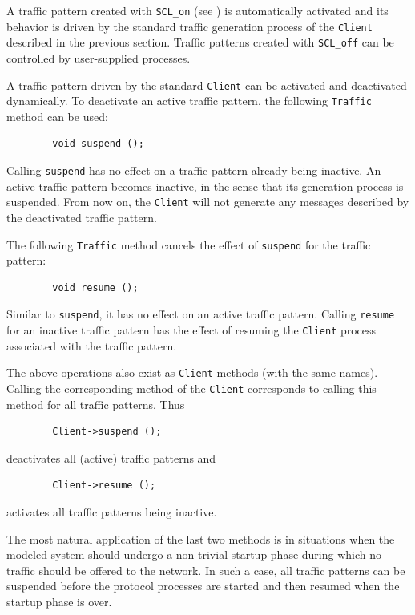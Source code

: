 A traffic pattern created with {\tt SCL\_on} (see )
is automatically activated and its behavior is driven by the standard
traffic generation process of the {\tt Client} described in the previous
section.
Traffic patterns created with {\tt SCL\_off} can be controlled by
user-supplied processes.

A traffic pattern driven by the standard {\tt Client} can be activated
and deactivated dynamically.
To deactivate an active traffic pattern,
the following {\tt Traffic} method can be used:
\begin{verbatim}
        void suspend ();
\end{verbatim}
Calling {\tt suspend} has no effect on a traffic pattern already being
inactive.
An active traffic pattern becomes inactive, in the sense that its
generation process is suspended.
From now on, the {\tt Client} will not generate any messages described
by the deactivated traffic pattern.

The following {\tt Traffic} method cancels the effect of {\tt suspend}
for the traffic pattern:
\begin{verbatim}
        void resume ();
\end{verbatim}
Similar to {\tt suspend}, it has no effect on an active traffic pattern.
Calling {\tt resume} for an inactive traffic pattern has the effect of
resuming the {\tt Client} process associated with the traffic pattern.

The above operations also exist as {\tt Client} methods (with the
same names).
Calling the corresponding method of the {\tt Client} corresponds to
calling this method for all traffic patterns.
Thus
\begin{verbatim}
        Client->suspend ();
\end{verbatim}
deactivates all (active) traffic patterns and
\begin{verbatim}
        Client->resume ();
\end{verbatim}
activates all traffic patterns being inactive.

The most natural application of the last two methods is in situations when
the modeled system should undergo a non-trivial startup phase
during which no traffic should be offered to the network.
In such a case, all traffic patterns can be suspended before the
protocol processes are started and then resumed when the startup phase is over.

